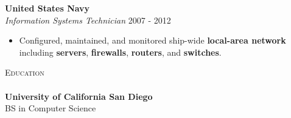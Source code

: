 \documentclass[a4paper]{article}
\newcommand{\lineunder} {
    \vspace*{-8pt} \\
    \hspace*{-18pt} \hrulefill \\
}
\newcommand{\header} [1] {
    {\hspace*{-18pt}\vspace*{6pt} \textsc{#1}}
    \vspace*{-6pt} \lineunder
}
\begin{document}
\textbf{United States Navy} \hfill \\
\textit{Information Systems Technician} \hfill 2007 - 2012\\
\vspace{-1mm}
\begin{itemize} \itemsep 1pt
	\item Configured, maintained, and monitored ship-wide \textbf{local-area network} including \textbf{servers}, \textbf{firewalls}, \textbf{routers}, and \textbf{switches}.
\end{itemize}

\header{Education}
\textbf{University of California San Diego}\hfill \\
BS in Computer Science \hfill \\
\end{document}
